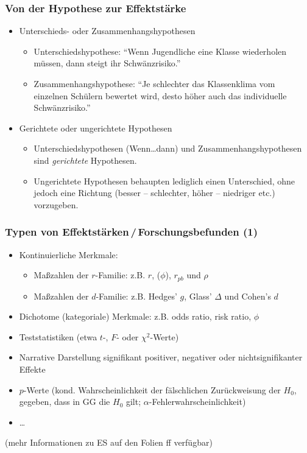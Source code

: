 \begin{frame}
  \frametitle{Von der Hypothese zur Effektstärke}
  \begin{itemize}[<+->]
  \item Unterschieds- oder Zusammenhangshypothesen
    \begin{itemize}
    \item Unterschiedshypothese: "`Wenn Jugendliche eine Klasse wiederholen müssen, dann steigt ihr Schwänzrisiko."'
    \item Zusammenhangshypothese: "`Je schlechter das Klassenklima vom einzelnen Schülern bewertet wird, desto höher
      auch das individuelle Schwänzrisiko."'
    \end{itemize}
  \item Gerichtete oder ungerichtete Hypothesen
    \begin{itemize}
    \item Unterschiedshypothesen (Wenn\ldots dann) und Zusammenhangshypothesen sind \emph{gerichtete} Hypothesen.
    \item Ungerichtete Hypothesen behaupten lediglich einen Unterschied, ohne jedoch eine Richtung (besser --
      schlechter, höher -- niedriger etc.) vorzugeben.
    \end{itemize}
\end{itemize}
\end{frame}


\begin{frame}
  \frametitle{Typen von Effektstärken\,/\,Forschungsbefunden (1)}
  \begin{itemize}[<+->]
  \item Kontinuierliche Merkmale:
    \begin{itemize}
    \item Maßzahlen der $r$-Familie: z.B. $r$, ($\phi$), $r_{pb}$ und $\rho$
    \item Maßzahlen der $d$-Familie: z.B. Hedges' $g$, Glass' $\Delta$ und Cohen's $d$
    \end{itemize}
  \item Dichotome (kategoriale) Merkmale: z.B. odds ratio, risk ratio, $\phi$
  \item Teststatistiken (etwa $t$-, $F$- oder $\chi^2$-Werte)
  \item Narrative Darstellung signifikant positiver, negativer oder nichtsignifikanter Effekte
  \item $p$-Werte (kond. Wahrscheinlichkeit der fälschlichen Zurückweisung der $H_0$, gegeben, dass in GG die $H_0$
    gilt; $\alpha$-Fehlerwahrscheinlichkeit)
  \item \ldots
  \end{itemize}

  (mehr Informationen zu ES auf den Folien \pageref{sec:effectstaerken}ff verfügbar)

\end{frame}



